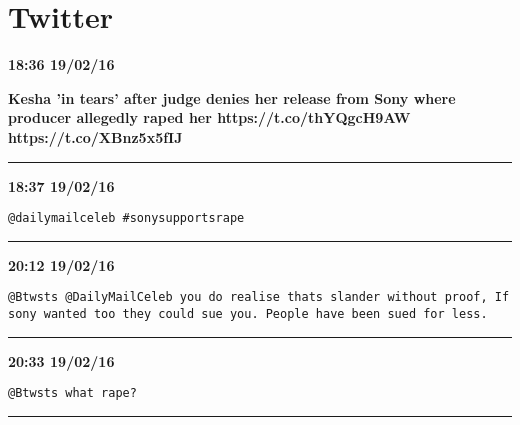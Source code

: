 \section{Twitter}
\label{threads:twitter}

\begin{adjustwidth}{0cm}{0cm}
\footnotesize \textbf{18:36 19/02/16}

\large \textbf{Kesha 'in tears' after judge denies her release from Sony where producer allegedly raped her https://t.co/thYQgcH9AW https://t.co/XBnz5x5fIJ}
\end{adjustwidth}

\hrule%

\begin{adjustwidth}{2cm}{0cm}
\footnotesize \textbf{18:37 19/02/16}

\begin{lstlisting}[breaklines, breakatwhitespace, basicstyle=\small, frame=leftline]
@dailymailceleb #sonysupportsrape
\end{lstlisting}
\end{adjustwidth}

\hrule%

\begin{adjustwidth}{4cm}{0cm}
\footnotesize \textbf{20:12 19/02/16}

\begin{lstlisting}[breaklines, breakatwhitespace, basicstyle=\small, frame=leftline]
@Btwsts @DailyMailCeleb you do realise thats slander without proof, If sony wanted too they could sue you. People have been sued for less.
\end{lstlisting}
\end{adjustwidth}

\hrule%

\begin{adjustwidth}{4cm}{0cm}
\footnotesize \textbf{20:33 19/02/16}

\begin{lstlisting}[breaklines, breakatwhitespace, basicstyle=\small, frame=leftline]
@Btwsts what rape?
\end{lstlisting}
\end{adjustwidth}

\hrule%

